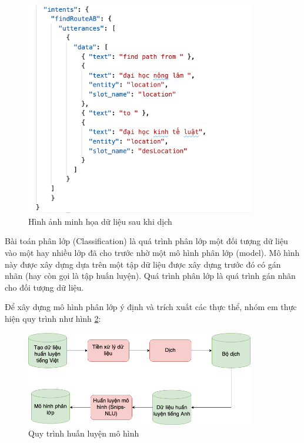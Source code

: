 \begin{figure}[H]
    \centering
    \includegraphics[width=10cm]{images/Data-train-ex.png}
    \caption{Hình ảnh minh họa dữ liệu sau khi dịch}
    \label{fig:data-train-en} 
\end{figure}


Bài toán phân lớp (Classification) là quá trình phân lớp một đối tượng dữ liệu vào một hay nhiều lớp đã cho trước nhờ một mô hình phân lớp (model). Mô hình này được xây dựng dựa trên một tập dữ liệu được xây dựng trước đó có gán nhãn (hay còn gọi là tập huấn luyện). Quá trình phân lớp là quá trình gán nhãn cho đối tượng dữ liệu.



Để xây dựng mô hình phân lớp ý định và trích xuất các thực thể, nhóm em thực hiện quy trình như hình \ref{fig:FlowTrainingData}:

\begin{figure}[H]
    \centering
    \includegraphics[width=10cm]{images/FlowTrainingData.png}
    \caption{Quy trình huấn luyện mô hình}
    \label{fig:FlowTrainingData}
\end{figure}

